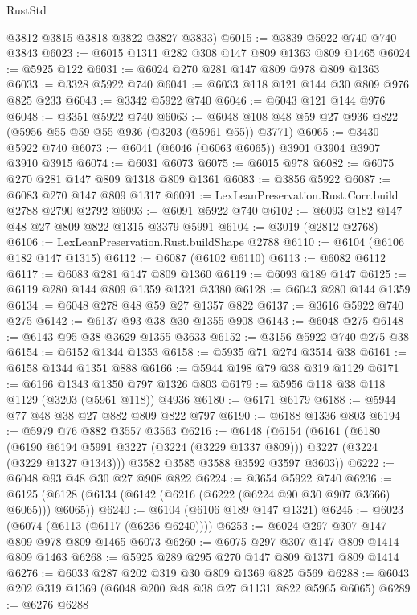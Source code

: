 \begin{lexlean}{RustStd}
\begin{coremodule}
      @3812
      @3815
      @3818
      @3822
      @3827
      @3833)
@6015 := @3839 @5922 @740 @740 @3843
@6023 := @6015 @1311 @282 @308 @147 @809 @1363 @809 @1465
@6024 := @5925 @122
@6031 := @6024 @270 @281 @147 @809 @978 @809 @1363
@6033 := @3328 @5922 @740
@6041 := @6033 @118 @121 @144 @30 @809 @976 @825 @233
@6043 := @3342 @5922 @740
@6046 := @6043 @121 @144 @976
@6048 := @3351 @5922 @740
@6063 := @6048 @108 @48 @59 @27 @936 @822 (@5956 @55 @59 @55 @936 (@3203 (@5961 @55)) @3771)
@6065 := @3430 @5922 @740
@6073 := @6041 (@6046 (@6063 @6065)) @3901 @3904 @3907 @3910 @3915
@6074 := @6031 @6073
@6075 := @6015 @978
@6082 := @6075 @270 @281 @147 @809 @1318 @809 @1361
@6083 := @3856 @5922
@6087 := @6083 @270 @147 @809 @1317
@6091 := LexLeanPreservation.Rust.Corr.build @2788 @2790 @2792
@6093 := @6091 @5922 @740
@6102 := @6093 @182 @147 @48 @27 @809 @822 @1315 @3379 @5991
@6104 := @3019 (@2812 @2768)
@6106 := LexLeanPreservation.Rust.buildShape @2788
@6110 := @6104 (@6106 @182 @147 @1315)
@6112 := @6087 (@6102 @6110)
@6113 := @6082 @6112
@6117 := @6083 @281 @147 @809 @1360
@6119 := @6093 @189 @147
@6125 := @6119 @280 @144 @809 @1359 @1321 @3380
@6128 := @6043 @280 @144 @1359
@6134 := @6048 @278 @48 @59 @27 @1357 @822
@6137 := @3616 @5922 @740 @275
@6142 := @6137 @93 @38 @30 @1355 @908
@6143 := @6048 @275
@6148 := @6143 @95 @38 @3629 @1355 @3633
@6152 := @3156 @5922 @740 @275 @38
@6154 := @6152 @1344 @1353
@6158 := @5935 @71 @274 @3514 @38
@6161 := @6158 @1344 @1351 @888
@6166 := @5944 @198 @79 @38 @319 @1129
@6171 := @6166 @1343 @1350 @797 @1326 @803
@6179 := @5956 @118 @38 @118 @1129 (@3203 (@5961 @118)) @4936
@6180 := @6171 @6179
@6188 := @5944 @77 @48 @38 @27 @882 @809 @822 @797
@6190 := @6188 @1336 @803
@6194 := @5979 @76 @882 @3557 @3563
@6216 := @6148
    (@6154
      (@6161
        (@6180
          (@6190 @6194 @5991 @3227 (@3224 (@3229 @1337 @809)))
          @3227
          (@3224 (@3229 @1327 @1343)))
        @3582
        @3585
        @3588
        @3592
        @3597
        @3603))
@6222 := @6048 @93 @48 @30 @27 @908 @822
@6224 := @3654 @5922 @740
@6236 := @6125 (@6128 (@6134 (@6142 (@6216 (@6222 (@6224 @90 @30 @907 @3666) @6065))) @6065))
@6240 := @6104 (@6106 @189 @147 @1321)
@6245 := @6023 (@6074 (@6113 (@6117 (@6236 @6240))))
@6253 := @6024 @297 @307 @147 @809 @978 @809 @1465 @6073
@6260 := @6075 @297 @307 @147 @809 @1414 @809 @1463
@6268 := @5925 @289 @295 @270 @147 @809 @1371 @809 @1414
@6276 := @6033 @287 @202 @319 @30 @809 @1369 @825 @569
@6288 := @6043 @202 @319 @1369 (@6048 @200 @48 @38 @27 @1131 @822 @5965 @6065)
@6289 := @6276 @6288

\end{coremodule}
\end{lexlean}
